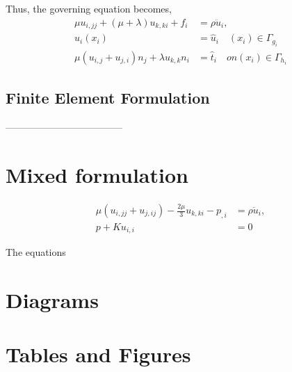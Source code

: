\documentclass[11pt,a4paper]{article}
\theoremstyle{plain}
\theoremstyle{definition}
\theoremstyle{remark}
\newcommand{\pr}[1]{\left(#1\right)}
\begin{document}
Thus, the governing equation becomes, 
\begin{align}
\mu u_{i,jj}+\pr{\mu+\lambda} u_{k,ki}+f_i&=\rho \ddot{u}_i, \\
u_{i}(x_i)&=\hat{u}_i\quad \pr{x_i}\in \Gamma_{g_i}\\
\mu \pr{u_{i,j}+u_{j,i}}n_j+\lambda u_{k,k}n_i&=\hat{t}_i\quad on \pr{x_i}\in \Gamma_{h_i} 
\end{align}

\subsection{Finite Element Formulation}

------------------------------------
\section{Mixed formulation} 


\begin{subequations}
\begin{align}
  \mu \pr{u_{i,jj}+u_{j,ij}}-\frac{2\mu}{3}u_{k,ki}-p_{,i}&=\rho \ddot{u}_{i},\\
  p+K u_{i,i}&=0
\end{align}
\label{eq:MFGeq}
\end{subequations}

The equations 
\section{Diagrams}

\begin{center}
\end{center}

\section{Tables and Figures}
\end{document}
